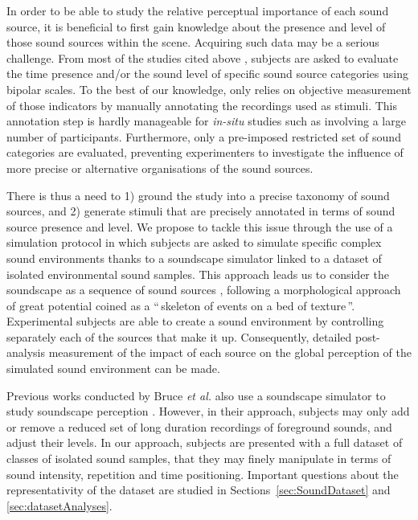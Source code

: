 \documentclass[twoside,twocolumn]{article}
\begin{document}
In order to be able to study the relative perceptual importance of each sound source, it is beneficial to first gain knowledge about the presence and level of those sound sources within  the scene. Acquiring such data may be a serious challenge. From most of the studies cited above \cite{guyot2005urban, lavandier2006contribution, ricciardi2015sound}, subjects are asked to evaluate the time presence and/or the sound level of specific sound source categories using bipolar scales. To the best of our knowledge, only \cite{lavandier2006contribution} relies on objective measurement of those indicators by manually annotating the recordings used as stimuli. This annotation step is hardly manageable for \emph{in-situ} studies such as \cite{ricciardi2015sound} involving a large number of participants. Furthermore, only a pre-imposed restricted set of sound categories are evaluated, preventing experimenters to investigate the influence of more precise or alternative organisations of the sound sources.

There is thus a need to 1) ground the study into a precise taxonomy of sound sources, and 2) generate stimuli that are precisely annotated in terms of sound source presence and level. We propose to tackle this issue through the use of a simulation protocol in which subjects are asked to simulate specific complex sound environments thanks to a soundscape simulator linked to a dataset of isolated environmental sound samples. This approach leads us to consider the soundscape as a sequence of sound sources \cite{nelken_ear_2013}, following a morphological approach of great potential coined as a ``\,skeleton of events on a bed of texture\,''. Experimental subjects are able to create a sound environment by controlling separately each of the sources that make it up. Consequently, detailed post-analysis measurement of the impact of each source on the global perception of the simulated sound environment can be made. 

Previous works conducted by Bruce \textit{et al.} also use a soundscape simulator to study soundscape perception \cite{bruce2009development,bruce2014effects}. However, in their approach, subjects may only add or remove a reduced set of long duration recordings of foreground sounds, and adjust their levels. In our approach, subjects are presented with a full dataset of classes of isolated sound samples, that they may finely manipulate in terms of sound intensity, repetition and time positioning. Important questions about the representativity of the  dataset are studied in Sections~\ref{sec:SoundDataset} and  \ref{sec:datasetAnalyses}.
\end{document}
